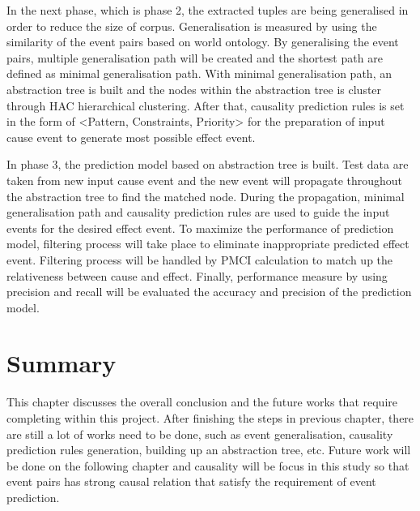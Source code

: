 \documentclass[twoside]{utmthesis}
\begin{document}
In the next phase, which is phase 2, the extracted tuples are being generalised in order to reduce the size of corpus. Generalisation is measured by using the similarity of the event pairs based on world ontology. By generalising the event pairs, multiple generalisation path will be created and the shortest path are defined as minimal generalisation path. With minimal generalisation path, an abstraction tree is built and the nodes within the abstraction tree is cluster through HAC hierarchical clustering. After that, causality prediction rules is set in the form of <Pattern, Constraints, Priority> for the preparation of input cause event to generate most possible effect event. 

In phase 3, the prediction model based on abstraction tree is built. Test data are taken from new input cause event and the new event will propagate throughout the abstraction tree to find the matched node. During the propagation, minimal generalisation path and causality prediction rules are used to guide the input events for the desired effect event. To maximize the performance of prediction model, filtering process will take place to eliminate inappropriate predicted effect event. Filtering process will be handled by PMCI calculation to match up the relativeness between cause and effect. Finally, performance measure by using precision and recall will be evaluated the accuracy and precision of the prediction model. 

\section{Summary}
This chapter discusses the overall conclusion and the future works that require completing within this project. After finishing the steps in previous chapter, there are still a lot of works need to be done, such as event generalisation, causality prediction rules generation, building up an abstraction tree, etc. Future work will be done on the following chapter and causality will be focus in this study so that event pairs has strong causal relation that satisfy the requirement of event prediction.  






\appendix
\end{document}
